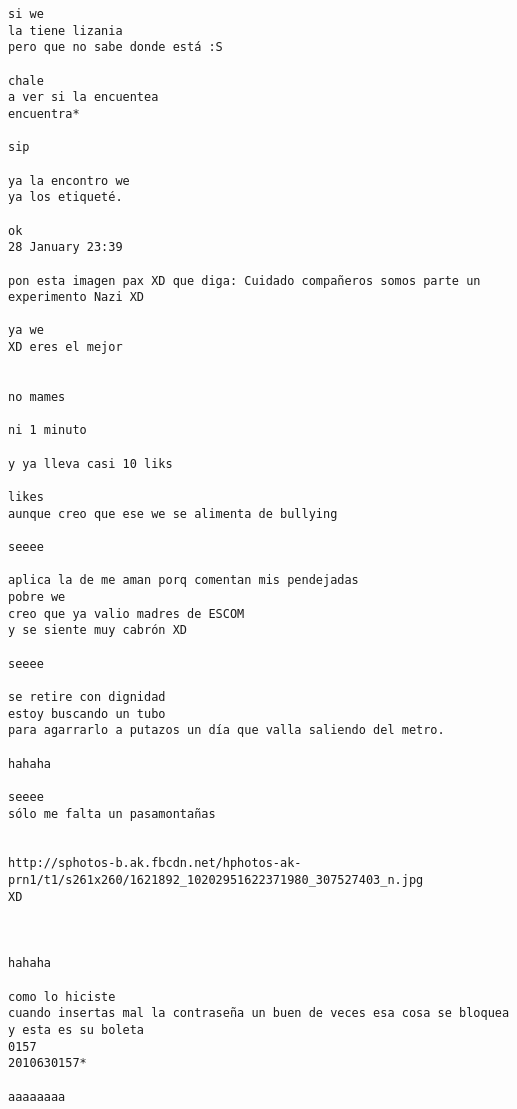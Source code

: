 \begin{verbatim}
si we
la tiene lizania
pero que no sabe donde está :S

chale
a ver si la encuentea
encuentra*

sip

ya la encontro we
ya los etiqueté.

ok
28 January 23:39

pon esta imagen pax XD que diga: Cuidado compañeros somos parte un experimento Nazi XD

ya we
XD eres el mejor


no mames

ni 1 minuto

y ya lleva casi 10 liks

likes
aunque creo que ese we se alimenta de bullying

seeee

aplica la de me aman porq comentan mis pendejadas
pobre we
creo que ya valio madres de ESCOM
y se siente muy cabrón XD

seeee

se retire con dignidad
estoy buscando un tubo
para agarrarlo a putazos un día que valla saliendo del metro.

hahaha

seeee
sólo me falta un pasamontañas


http://sphotos-b.ak.fbcdn.net/hphotos-ak-prn1/t1/s261x260/1621892_10202951622371980_307527403_n.jpg
XD



hahaha

como lo hiciste
cuando insertas mal la contraseña un buen de veces esa cosa se bloquea
y esta es su boleta
0157
2010630157*

aaaaaaaa

\end{verbatim}


